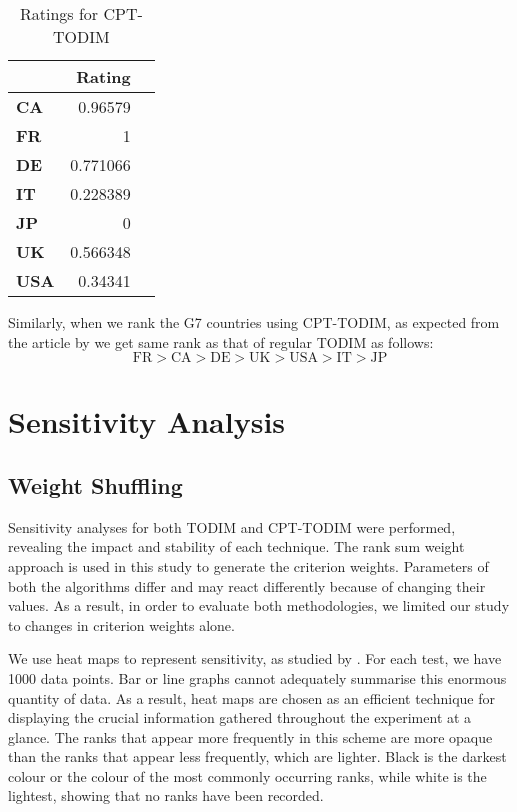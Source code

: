 \documentclass{infor}
\theoremstyle{remark}
\begin{document}
\begin{steps}
\begin{table}[!htp]\centering
\caption{Ratings for CPT-TODIM}\label{Table 9} 
\scriptsize
\begin{tabular}{lrr}\toprule
& \textbf{Rating}\\ \toprule
\textbf{CA} & 0.96579\\
\textbf{FR} & 1\\
\textbf{DE} & 0.771066\\
\textbf{IT} & 0.228389\\
\textbf{JP} & 0\\
\textbf{UK} & 0.566348\\
\textbf{USA} & 0.34341\\
\bottomrule
\end{tabular}
\end{table}

\end{steps}
Similarly, when we rank the G7 countries using CPT-TODIM, as expected from the article by \cite{tian2019extended} we get same rank as that of regular TODIM as follows:
\begin{equation}
\text{FR} > \text{CA} > \text{DE} > \text{UK} > \text{USA} > \text{IT} > \text{JP}
\end{equation}

\section{Sensitivity Analysis}
\subsection{Weight Shuffling}
Sensitivity analyses for both TODIM and CPT-TODIM were performed, revealing the impact and stability of each technique. The rank sum weight approach is used in this study to generate the criterion weights. Parameters of both the algorithms differ and may react differently because of changing their values. As a result, in order to evaluate both methodologies, we limited our study to changes in criterion weights alone.

We use heat maps to represent sensitivity, as studied by \cite{pryke2007heatmap}. For each test, we have 1000 data points. Bar or line graphs cannot adequately summarise this enormous quantity of data. As a result, heat maps are chosen as an efficient technique for displaying the crucial information gathered throughout the experiment at a glance. The ranks that appear more frequently in this scheme are more opaque than the ranks that appear less frequently, which are lighter. Black is the darkest colour or the colour of the most commonly occurring ranks, while white is the lightest, showing that no ranks have been recorded.
\end{document}
